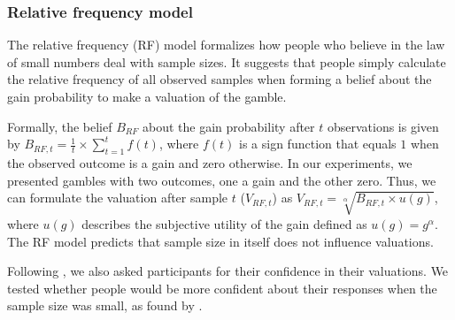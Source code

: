 \documentclass[a4paper,man, natbib]{apa6} %
\begin{document}
\subsubsection{Relative frequency model}

The relative frequency (RF) model formalizes how people who believe in the law of small numbers deal with sample sizes. 
It suggests that people simply calculate the relative frequency of all observed samples when forming a belief about the gain probability to make a valuation of the gamble. 


Formally, the belief ${B}_{RF}$ about the gain probability after $t$ observations is given by ${B}_{RF, t}  =  \frac{1}{t} \times \sum\limits_{t=1}^t f(t)$, where $f(t)$ is a sign function that equals $1$ when the observed outcome is a gain and zero otherwise. In our experiments, we presented gambles with two outcomes, one a gain and the other zero. Thus, we can formulate the valuation after sample $t$ ($V_{RF, t}$) as $V_{RF, t} = \sqrt[\alpha]{{B}_{RF, t} \times u({g})}$, where $u(g)$ describes the subjective utility of the gain defined as $u(g) = g^{\alpha}$. The RF model predicts that sample size in itself does not influence valuations.

Following \cite{Griffin1992}, we also asked participants for their confidence in their valuations. We tested whether people would be more confident about their responses when the sample size was small, as found by \cite{Griffin1992}. 
\end{document}
